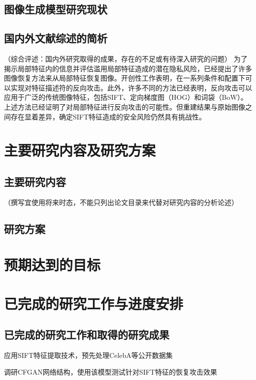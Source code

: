 \subsection{图像生成模型研究现状}
\subsection{国内外文献综述的简析}
（综合评述：国内外研究取得的成果，存在的不足或有待深入研究的问题）
为了揭示局部特征内的信息并评估滥用局部特征造成的潜在隐私风险，已经提出了许多图像恢复方法来从局部特征恢复图像。开创性工作表明，在一系列条件和配置下可以实现对特征描述符的反向攻击。此外，许多不同的方法已经表明，反向攻击可以应用于广泛的传统图像特征，包括SIFT、定向梯度图（HOG）和词袋（BoW）。上述方法已经证明了对局部特征进行反向攻击的可能性。但重建结果与原始图像之间存在显着差异，确定SIFT特征造成的安全风险仍然具有挑战性。
\section{主要研究内容及研究方案}
\subsection{主要研究内容}
（撰写宜使用将来时态，不能只列出论文目录来代替对研究内容的分析论述）
\subsection{研究方案}
\section{预期达到的目标}
\section{已完成的研究工作与进度安排}
\subsection{已完成的研究工作和取得的研究成果}
应用SIFT特征提取技术，预先处理CelebA等公开数据集
\par
调研CFGAN网络结构，使用该模型测试针对SIFT特征的恢复攻击效果
